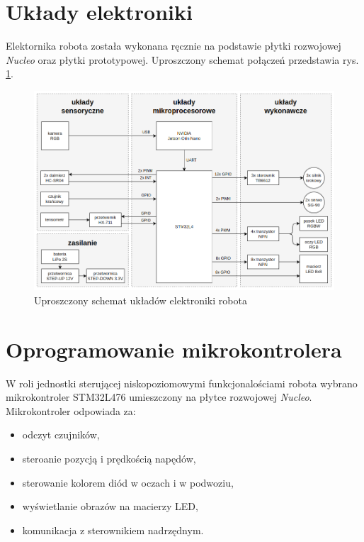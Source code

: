 \documentclass{article}
\begin{document}
    \section{Układy elektroniki}
        Elektornika robota została wykonana ręcznie na podstawie płytki rozwojowej \textit{Nucleo} oraz płytki prototypowej.
        Uproszczony schemat połączeń przedstawia rys. \ref{elektronika_schemat}.
        \begin{figure}[p]
            \centering
            \includegraphics[width=\textwidth]{figures/elektronika_schemat.png}
            \caption{Uproszczony schemat układów elektroniki robota}
            \label{elektronika_schemat}
        \end{figure}

    \pagebreak
    \section{Oprogramowanie mikrokontrolera}
        W roli jednostki sterującej niskopoziomowymi funkcjonalościami robota wybrano mikrokontroler STM32L476
        umieszczony na płytce rozwojowej \textit{Nucleo}. Mikrokontroler odpowiada za:
        \begin{itemize}
            \item odczyt czujników,
            \item steroanie pozycją i prędkością napędów,
            \item sterowanie kolorem diód w oczach i w podwoziu,
            \item wyświetlanie obrazów na macierzy LED,
            \item komunikacja z sterownikiem nadrzędnym.
        \end{itemize}
\end{document}
